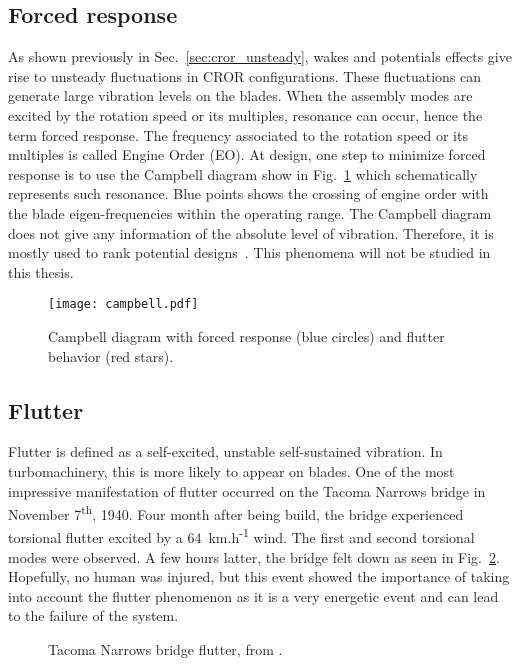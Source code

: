 
\subsection{Forced response}
\label{sub:forced_response}

As shown previously in Sec.~\ref{sec:cror_unsteady}, wakes and
potentials effects give rise to unsteady fluctuations in 
CROR configurations. These fluctuations 
can generate large vibration levels on the blades.
When the assembly modes are excited by the rotation speed
or its multiples, resonance can occur,
hence the term forced response. 
The frequency associated to the rotation speed or its multiples
is called Engine Order (EO).
At design, one step to minimize forced response is
to use the Campbell diagram show in Fig.~\ref{fig:campbell}
which schematically represents such resonance.
Blue points shows the crossing of engine order with 
the blade eigen-frequencies within the operating range. 
The Campbell diagram does not give any information of
the absolute level of vibration. Therefore, it is mostly
used to rank potential designs~\cite{Marshall1996}. This phenomena
will not be studied in this thesis.
\begin{figure}[htp]
  \centering
  \texttt{[image: campbell.pdf]}
  \caption{Campbell diagram with forced response (blue circles)
  and flutter behavior (red stars).}
  \label{fig:campbell}
\end{figure}


\subsection{Flutter}
\label{sub:flutter}

Flutter is defined as a self-excited, unstable 
self-sustained vibration. In turbomachinery, this is
more likely to appear on blades.
One of the most impressive
manifestation of flutter occurred on the Tacoma Narrows
bridge in November 7\textsuperscript{th}, 1940.
Four month after being build, the bridge experienced 
torsional flutter excited by a 
\mbox{$64$~km.h\textsuperscript{-1}} wind.
The first and second torsional modes were observed.
A few hours latter, the bridge felt down as seen in 
Fig.~\ref{fig:tacoma_bridge}. Hopefully, no human
was injured, but this event showed the importance
of taking into account the flutter phenomenon as
it is a very energetic event and can lead to the failure of the system.
\begin{figure}[htp]
  \centering
  \caption{Tacoma Narrows bridge flutter, from \citet{Smith1974}.}
  \label{fig:tacoma_bridge}
\end{figure}

